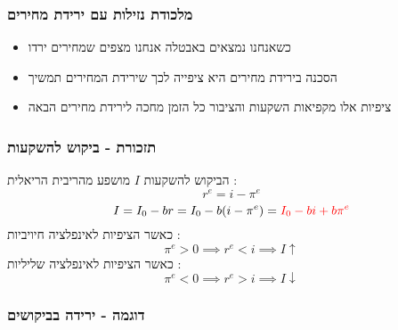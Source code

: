 \documentclass[usenames,dvipsnames]{beamer}
\begin{document}
\begin{RTL}
\begin{frame}
\begin{center}
    \end{center} 



\end{frame}

\begin{frame}
    \frametitle{מלכודת נזילות עם ירידת מחירים}
    \begin{itemize}
        \item כשאנחנו נמצאים באבטלה אנחנו מצפים שמחירים ירדו
        \item הסכנה בירידת מחירים היא ציפייה לכך שירידת המחירים תמשיך
        \item ציפיות אלו מקפיאות השקעות והציבור כל הזמן מחכה לירידת מחירים הבאה
    \end{itemize}

    

\end{frame}

\begin{frame}
    \frametitle{תזכורת - ביקוש להשקעות}
    הביקוש להשקעות $I$ מושפע מהריבית הריאלית :
    \begin{equation*}
        r^e = i - \pi^e
    \end{equation*}
    \begin{equation*}
        I = I_0 - br = I_0 - b(i - \pi^e) = \textcolor{red}{I_0 - bi + b\pi^e}
    \end{equation*}
    כאשר הציפיות לאינפלציה חיויביות : \\
    \begin{equation*}
        \pi^e > 0 \implies  r^e  < i \implies I \uparrow
    \end{equation*}
    כאשר הציפיות לאינפלציה שליליות : \\
    \begin{equation*}
        \pi^e < 0 \implies  r^e  > i \implies I \downarrow
    \end{equation*}
\end{frame}

\begin{frame}
    \frametitle{דוגמה - ירידה בביקושים}
    \begin{center}
\end{center}
\end{frame}
\end{RTL}
\end{document}
